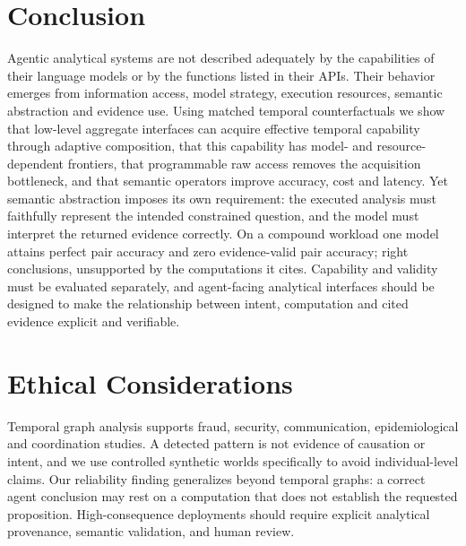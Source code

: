 \documentclass[sigconf,anonymous,review]{acmart}
\begin{document}
\section{Conclusion}
Agentic analytical systems are not described adequately by the capabilities of their language
models or by the functions listed in their APIs. Their behavior emerges from information access,
model strategy, execution resources, semantic abstraction and evidence use. Using matched temporal
counterfactuals we show that low-level aggregate interfaces can acquire effective temporal
capability through adaptive composition, that this capability has model- and resource-dependent
frontiers, that programmable raw access removes the acquisition bottleneck, and that semantic
operators improve accuracy, cost and latency. Yet semantic abstraction imposes its own requirement:
the executed analysis must faithfully represent the intended constrained question, and the model
must interpret the returned evidence correctly. On a compound workload one model attains perfect
pair accuracy and zero evidence-valid pair accuracy; right conclusions, unsupported by the
computations it cites. Capability and validity must be evaluated separately, and agent-facing
analytical interfaces should be designed to make the relationship between intent, computation and
cited evidence explicit and verifiable.

\section{Ethical Considerations}
Temporal graph analysis supports fraud, security, communication, epidemiological and coordination
studies. A detected pattern is not evidence of causation or intent, and we use controlled synthetic
worlds specifically to avoid individual-level claims. Our reliability finding generalizes beyond
temporal graphs: a correct agent conclusion may rest on a computation that does not establish the
requested proposition. High-consequence deployments should require explicit analytical provenance,
semantic validation, and human review.



\end{document}

